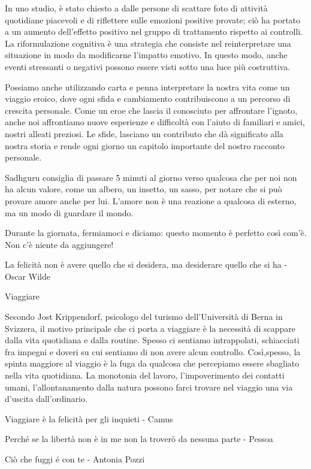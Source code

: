 \documentclass[12pt]{book} %
\begin{document}
In uno studio, è stato chiesto a dalle persone di scattare foto di attività quotidiane piacevoli e di riflettere sulle emozioni positive provate; ciò ha portato a un aumento dell'effetto positivo nel gruppo di trattamento rispetto ai controlli. La riformulazione cognitiva è una strategia che consiste nel reinterpretare una situazione in modo da modificarne l’impatto emotivo. In questo modo, anche eventi stressanti o negativi possono essere visti sotto una luce più costruttiva.

Possiamo anche utilizzando carta e penna interpretare la nostra vita come un viaggio eroico, dove ogni sfida e cambiamento contribuiscono a un percorso di crescita personale. Come un eroe che lascia il conosciuto per affrontare l’ignoto, anche noi affrontiamo nuove esperienze e difficoltà con l’aiuto di familiari e amici, nostri alleati preziosi. Le sfide, lasciano un contributo che dà significato alla nostra storia e rende ogni giorno un capitolo importante del nostro racconto personale.

Sadhguru consiglia di passare 5 minuti al giorno verso qualcosa che per noi non ha alcun valore, come un albero, un
insetto, un sasso, per notare che si può provare amore anche per lui. L'amore non è una reazione a qualcosa di esterno,
ma un modo di guardare il mondo.

Durante la giornata, fermiamoci e diciamo: questo momento è perfetto così com'è. Non c'è niente da aggiungere!

La felicità non è avere quello che si desidera, ma desiderare quello che si ha - Oscar Wilde 

\begin{mdframed}[linewidth=1pt]
Viaggiare

Secondo Jost Krippendorf, psicologo del turismo dell'Università di Berna in Svizzera, il motivo principale che ci porta a viaggiare è la necessità di scappare dalla vita quotidiana e dalla routine. Spesso ci sentiamo intrappolati, schiacciati fra impegni e doveri su cui sentiamo di non avere alcun controllo. Così,spesso, la spinta maggiore al viaggio è la fuga da qualcosa che percepiamo essere sbagliato nella vita quotidiana. 
La monotonia del lavoro, l'impoverimento dei contatti umani, l'allontanamento dalla natura possono farci trovare nel viaggio una via d'uscita dall'ordinario.

Viaggiare è la felicità per gli inquieti - Camus

Perché se la libertà non è in me non la troverò da nessuna parte - Pessoa

Ciò che fuggi é con te - Antonia Pozzi
\end{mdframed}
\end{document}
